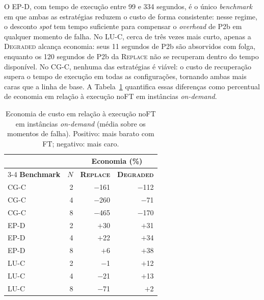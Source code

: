 \documentclass[a4paper,11pt]{article}
\begin{document}
            O EP-D, com tempo de execução entre 99 e 334 segundos, é o único
            \textit{benchmark} em que ambas as estratégias reduzem o custo de forma
            consistente: nesse regime, o desconto \textit{spot} tem tempo suficiente
            para compensar o \textit{overhead} de P2b em qualquer momento de falha.
            No LU-C, cerca de três vezes mais curto, apenas a \textsc{Degraded} alcança
            economia: seus 11 segundos de P2b são absorvidos com folga, enquanto os
            120 segundos de P2b da \textsc{Replace} não se recuperam dentro do tempo
            disponível. No CG-C, nenhuma das estratégias é viável: o custo de
            recuperação supera o tempo de execução em todas as configurações, tornando
            ambas mais caras que a linha de base. A Tabela~\ref{tab:cost} quantifica
            essas diferenças como percentual de economia em relação à execução noFT
            em instâncias \textit{on-demand}.

            \begin{table}[htb]
                \caption{Economia de custo em relação à execução noFT em instâncias
                         \textit{on-demand} (média sobre os momentos de falha).
                         Positivo: mais barato com FT; negativo: mais caro.}
                \label{tab:cost}
                \centering
                \small
                \begin{tabular}{lrrr}
                    \toprule
                    & & \multicolumn{2}{c}{\textbf{Economia (\%)}} \\
                    \cmidrule(lr){3-4}
                    \textbf{Benchmark} & \textbf{$N$} & \textbf{\textsc{Replace}} & \textbf{\textsc{Degraded}} \\
                    \midrule
                    CG-C & 2 & $-$161 & $-$112 \\
                    CG-C & 4 & $-$260 & $-$71  \\
                    CG-C & 8 & $-$465 & $-$170 \\
                    \addlinespace
                    EP-D & 2 & $+$30  & $+$31  \\
                    EP-D & 4 & $+$22  & $+$34  \\
                    EP-D & 8 & $+$6   & $+$38  \\
                    \addlinespace
                    LU-C & 2 & $-$1   & $+$12  \\
                    LU-C & 4 & $-$21  & $+$13  \\
                    LU-C & 8 & $-$71  & $+$2   \\
                    \bottomrule
                \end{tabular}
            \end{table}
\end{document}
